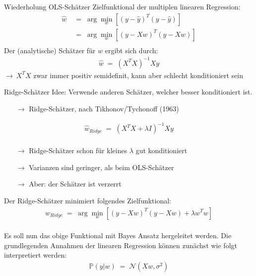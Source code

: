 \documentclass{beamer}
\begin{document}
{\begin{frame}{Wiederholung OLS-Schätzer}
	Zielfunktional der multiplen linearen Regression:
	\begin{align}
		\hat{w}&\;=\;\arg\underset{w}{\min}\left[\left(y-\hat{y}\right)^T\left(y-\hat{y}\right)\right] \\
		&\;=\;\arg\underset{w}{\min}\left[\left(y-Xw\right)^T\left(y-Xw\right)\right]\\
	\end{align}
	Der (analytische) Schätzer für $w$ ergibt sich durch:
	\begin{align}
		\hat{w}\;=\;\left(X^TX\right)^{-1}Xy
	\end{align}
	$\rightarrow\: X^TX$ zwar immer positiv semidefinit, kann aber schlecht konditioniert sein
\end{frame}

\begin{frame}{Ridge-Schätzer}
	Idee: Verwende anderen Schätzer, welcher besser konditioniert ist.
	\begin{itemize}
		\item[$\rightarrow$] Ridge-Schätzer, nach Tikhonov/Tychonoff (1963)
	\end{itemize}
	\begin{align}
		\hat{w}_{Ridge}\;=\;\left(X^TX+\lambda I\right)^{-1}Xy\\
	\end{align}
	\begin{itemize}
		\item[$\rightarrow$] Ridge-Schätzer schon für kleines $\lambda$ gut konditioniert
		\item[$\rightarrow$] Varianzen sind geringer, als beim OLS-Schätzer
		\item[$\rightarrow$] Aber: der Schätzer ist verzerrt
	\end{itemize}
\end{frame}

\begin{frame}
	Der Ridge-Schätzer minimiert folgendes Zielfunktional:
	\begin{align}
		\hat{w}_{Ridge}\;=\;\arg\underset{w}{\min}\left[\left(y-Xw\right)^T\left(y-Xw\right)+\lambda w^Tw\right]
	\end{align}
	\hfill\\[0,5cm]
	Es soll nun das obige Funktional mit Bayes Ansatz hergeleitet werden. Die grundlegenden Annahmen der linearen Regression können zunächst wie folgt interpretiert werden:
	\begin{align}
		\mathbb{P}(y\vert w)\;=\;\mathcal{N}(Xw,\sigma^2)
	\end{align}
\end{frame}

}
\end{document}
